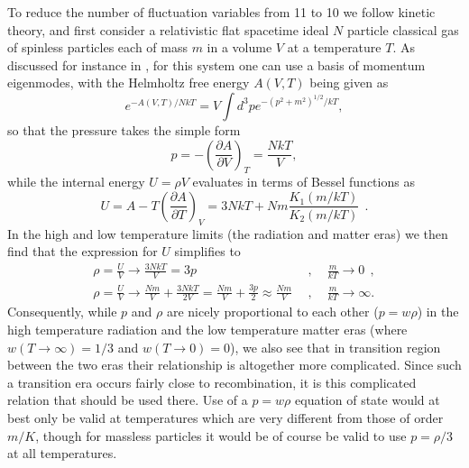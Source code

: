 \documentclass[aps,onecolumn,10pt]{revtex4}
\numberwithin{equation}{section}
\numberwithin{equation}{section}
\begin{document}
To reduce the number of fluctuation variables from 11 to 10 we follow kinetic theory, and first consider a relativistic flat spacetime ideal $N$ particle classical gas of spinless particles each of mass $m$ in a volume $V$ at a temperature $T$. As discussed for instance in \cite{Mannheim2006}, for this
system one can use a basis of momentum eigenmodes, with the Helmholtz free energy $A(V,T)$ being given as 
%                                                                               
\begin{equation}
e^{-A(V,T)/NkT}=V\int
d^3pe^{-(p^2+m^2)^{1/2}/kT}, 
\label{9.50}
\end{equation}                                 
%  
so that the pressure takes the simple form 
%                                                                               
\begin{equation}
p=-\left(\frac{\partial A}{ \partial
V}\right)_T=\frac{NkT}{V},
\label{9.51}
\end{equation}                                 
% 
while the internal energy $U=\rho V$ evaluates in terms of Bessel
functions as  
%                                                                               
\begin{equation}
U=A-T\left(\frac{\partial A}{ \partial
T}\right)_V=3NkT+Nm\frac{K_1(m/kT)}{K_2(m/kT)}~~.
\label{9.52}
\end{equation}                                 
% 
In the high and low temperature limits (the radiation and matter eras)
we then find that the expression for $U$ simplifies to
%                                                                               
\begin{eqnarray}
\rho=\frac{U}{V}\rightarrow
\frac{3NkT}{V}=3p~~&,&~~\frac{m}{kT}\rightarrow 0~~,
\nonumber \\
\rho=\frac{U}{V} \rightarrow
\frac{Nm}{V}+\frac{3NkT}{2V}=\frac{Nm}{V}+\frac{3p}{2} \approx
\frac{Nm}{V}~~&, &~~\frac{m}{kT}
\rightarrow \infty.
\label{9.53}
\end{eqnarray}                                 
% 
Consequently, while $p$ and $\rho$ are nicely proportional to each other ($p=w\rho$)
in the high temperature radiation and the low temperature matter eras
(where $w(T\rightarrow\infty)=1/3$ and $w(T\rightarrow 0)=0$), we also
see that in transition region between the two eras their relationship is
altogether more complicated. Since such a transition era occurs fairly close to recombination, it is this complicated relation that should be used there. Use of a $p=w\rho$ equation of state would at best only be valid at temperatures which are very different from
those of order $m/K$, though for massless particles it would be of
course be valid to use $p=\rho/3$ at all temperatures. 
\end{document}
